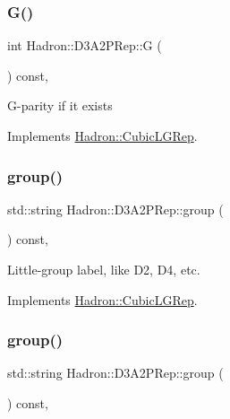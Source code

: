 \subsubsection{\texorpdfstring{G()}{G()}\hspace{0.1cm}{\footnotesize\ttfamily [2/2]}}
{\footnotesize\ttfamily int Hadron\+::\+D3\+A2\+P\+Rep\+::G (\begin{DoxyParamCaption}{ }\end{DoxyParamCaption}) const\hspace{0.3cm}{\ttfamily [inline]}, {\ttfamily [virtual]}}

G-\/parity if it exists 

Implements \mbox{\hyperlink{structHadron_1_1CubicLGRep_ace26f7b2d55e3a668a14cb9026da5231}{Hadron\+::\+Cubic\+L\+G\+Rep}}.

\mbox{\label{structHadron_1_1D3A2PRep_a920496e210c2cdc2edb80a9903cd443a}} 
\subsubsection{\texorpdfstring{group()}{group()}\hspace{0.1cm}{\footnotesize\ttfamily [1/2]}}
{\footnotesize\ttfamily std\+::string Hadron\+::\+D3\+A2\+P\+Rep\+::group (\begin{DoxyParamCaption}{ }\end{DoxyParamCaption}) const\hspace{0.3cm}{\ttfamily [inline]}, {\ttfamily [virtual]}}

Little-\/group label, like D2, D4, etc. 

Implements \mbox{\hyperlink{structHadron_1_1CubicLGRep_a9bdb14b519a611d21379ed96a3a9eb41}{Hadron\+::\+Cubic\+L\+G\+Rep}}.

\mbox{\label{structHadron_1_1D3A2PRep_a920496e210c2cdc2edb80a9903cd443a}} 
\subsubsection{\texorpdfstring{group()}{group()}\hspace{0.1cm}{\footnotesize\ttfamily [2/2]}}
{\footnotesize\ttfamily std\+::string Hadron\+::\+D3\+A2\+P\+Rep\+::group (\begin{DoxyParamCaption}{ }\end{DoxyParamCaption}) const\hspace{0.3cm}{\ttfamily [inline]}, {\ttfamily [virtual]}}

